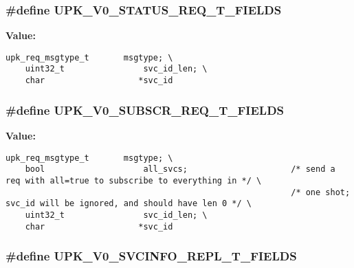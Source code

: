 \subsubsection{\setlength{\rightskip}{0pt plus 5cm}\#define UPK\_\-V0\_\-STATUS\_\-REQ\_\-T\_\-FIELDS}\label{upk__v0__protocol__structs_8h_92e2c3ae3ec30885465a26dd0e73c7fe}


\textbf{Value:}

\begin{Code}\begin{verbatim}upk_req_msgtype_t       msgtype; \
    uint32_t                svc_id_len; \
    char                   *svc_id
\end{verbatim}\end{Code}
\subsubsection{\setlength{\rightskip}{0pt plus 5cm}\#define UPK\_\-V0\_\-SUBSCR\_\-REQ\_\-T\_\-FIELDS}\label{upk__v0__protocol__structs_8h_f3456a3f8b91f7df4cf5489b4d66c3c1}


\textbf{Value:}

\begin{Code}\begin{verbatim}upk_req_msgtype_t       msgtype; \
    bool                    all_svcs;                     /* send a req with all=true to subscribe to everything in */ \
                                                          /* one shot; svc_id will be ignored, and should have len 0 */ \
    uint32_t                svc_id_len; \
    char                   *svc_id
\end{verbatim}\end{Code}
\subsubsection{\setlength{\rightskip}{0pt plus 5cm}\#define UPK\_\-V0\_\-SVCINFO\_\-REPL\_\-T\_\-FIELDS}\label{upk__v0__protocol__structs_8h_d18c68ae7a62387148d1afa2451ac02a}


